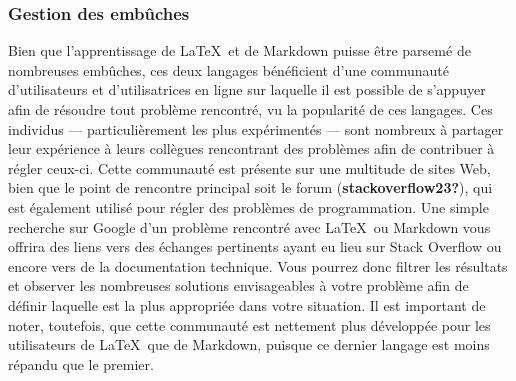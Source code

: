 \documentclass[
  letterpaper,
  DIV=11,
  numbers=noendperiod]{scrreprt}
\begin{document}
\subsubsection{Gestion des embûches}\label{gestion-des-embuxfbches}

Bien que l'apprentissage de \LaTeX~et de Markdown puisse être parsemé de
nombreuses embûches, ces deux langages bénéficient d'une communauté
d'utilisateurs et d'utilisatrices en ligne sur laquelle il est possible
de s'appuyer afin de résoudre tout problème rencontré, vu la popularité
de ces langages. Ces individus --- particulièrement les plus
expérimentés --- sont nombreux à partager leur expérience à leurs
collègues rencontrant des problèmes afin de contribuer à régler ceux-ci.
Cette communauté est présente sur une multitude de sites Web, bien que
le point de rencontre principal soit le forum
(\textbf{stackoverflow23?}), qui est également utilisé pour régler des
problèmes de programmation. Une simple recherche sur Google d'un
problème rencontré avec \LaTeX~ou Markdown vous offrira des liens vers
des échanges pertinents ayant eu lieu sur Stack Overflow ou encore vers
de la documentation technique. Vous pourrez donc filtrer les résultats
et observer les nombreuses solutions envisageables à votre problème afin
de définir laquelle est la plus appropriée dans votre situation. Il est
important de noter, toutefois, que cette communauté est nettement plus
développée pour les utilisateurs de \LaTeX~que de Markdown, puisque ce
dernier langage est moins répandu que le premier.
\end{document}
